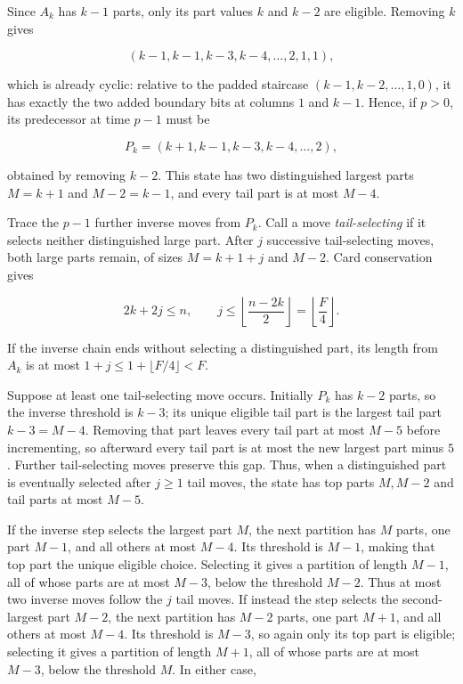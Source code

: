 \documentclass[11pt,a4paper]{article}
\begin{document}
Since $A_k$ has $k-1$ parts, only its part values $k$ and $k-2$ are eligible. Removing $k$ gives

\[
(k-1,k-1,k-3,k-4,\ldots,2,1,1),
\]

which is already cyclic: relative to the padded staircase $(k-1,k-2,\ldots,1,0)$, it has exactly the two added boundary bits at columns $1$ and $k-1$. Hence, if $p>0$, its predecessor at time $p-1$ must be

\[
P_k=(k+1,k-1,k-3,k-4,\ldots,2),
\]

obtained by removing $k-2$. This state has two distinguished largest parts $M=k+1$ and $M-2=k-1$, and every tail part is at most $M-4$.

Trace the $p-1$ further inverse moves from $P_k$. Call a move \emph{tail-selecting} if it selects neither distinguished large part. After $j$ successive tail-selecting moves, both large parts remain, of sizes $M=k+1+j$ and $M-2$. Card conservation gives

\[
2k+2j\le n,\qquad
j\le\left\lfloor\frac{n-2k}{2}\right\rfloor
 =\left\lfloor\frac F4\right\rfloor.
\]

If the inverse chain ends without selecting a distinguished part, its length from $A_k$ is at most $1+j\le1+\lfloor F/4\rfloor<F$.

Suppose at least one tail-selecting move occurs. Initially $P_k$ has $k-2$ parts, so the inverse threshold is $k-3$; its unique eligible tail part is the largest tail part $k-3=M-4$. Removing that part leaves every tail part at most $M-5$ before incrementing, so afterward every tail part is at most the new largest part minus $5$. Further tail-selecting moves preserve this gap. Thus, when a distinguished part is eventually selected after $j\ge1$ tail moves, the state has top parts $M,M-2$ and tail parts at most $M-5$.

If the inverse step selects the largest part $M$, the next partition has $M$ parts, one part $M-1$, and all others at most $M-4$. Its threshold is $M-1$, making that top part the unique eligible choice. Selecting it gives a partition of length $M-1$, all of whose parts are at most $M-3$, below the threshold $M-2$. Thus at most two inverse moves follow the $j$ tail moves. If instead the step selects the second-largest part $M-2$, the next partition has $M-2$ parts, one part $M+1$, and all others at most $M-4$. Its threshold is $M-3$, so again only its top part is eligible; selecting it gives a partition of length $M+1$, all of whose parts are at most $M-3$, below the threshold $M$. In either case,
\end{document}
